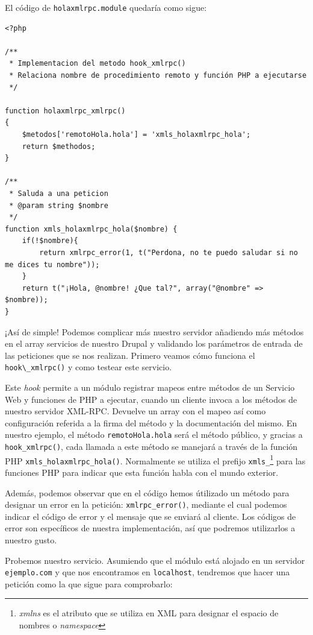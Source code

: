 El código de \verb|holaxmlrpc.module| quedaría como sigue:

\begin{verbatim}
<?php

/**
 * Implementacion del metodo hook_xmlrpc()
 * Relaciona nombre de procedimiento remoto y función PHP a ejecutarse
 */

function holaxmlrpc_xmlrpc()
{
    $metodos['remotoHola.hola'] = 'xmls_holaxmlrpc_hola';
    return $methodos;
}

/**
 * Saluda a una peticion
 * @param string $nombre
 */
function xmls_holaxmlrpc_hola($nombre) {
    if(!$nombre){
        return xmlrpc_error(1, t("Perdona, no te puedo saludar si no me dices tu nombre"));
    }
    return t("¡Hola, @nombre! ¿Que tal?", array("@nombre" => $nombre));
}
\end{verbatim}

¡Así de simple! Podemos complicar más nuestro servidor añadiendo más métodos en el array servicios de nuestro 
Drupal y validando los parámetros de entrada de las peticiones que se nos realizan. Primero veamos cómo funciona 
el \verb|hook\_xmlrpc()| y como testear este servicio.

Este \textit{hook} permite a un módulo registrar mapeos entre métodos de un Servicio Web y funciones de PHP 
a ejecutar, cuando un cliente invoca a los métodos de nuestro servidor XML-RPC. Devuelve un array con el mapeo así 
como configuración referida a la firma del método y la documentación del mismo. En nuestro ejemplo, el método 
\verb|remotoHola.hola| será el método público, y gracias a \verb|hook_xmlrpc()|, cada llamada a este método se 
manejará a través de la función PHP \verb|xmls_holaxmlrpc_hola()|. Normalmente se utiliza el prefijo \verb|xmls_|\footnote{
\textit{xmlns} es el atributo que se utiliza en XML para designar el espacio de nombres o \textit{namespace}} para las funciones 
PHP para indicar que esta función habla con el mundo exterior.

Además, podemos observar que en el código hemos útilizado un método para designar un error en la petición: 
\verb|xmlrpc_error()|, mediante el cual podemos indicar el código de error y el mensaje que se enviará al cliente. Los 
códigos de error son específicos de nuestra implementación, así que podremos utilizarlos a nuestro gusto.

Probemos nuestro servicio. Asumiendo que el módulo está alojado en un servidor \verb|ejemplo.com| y que nos 
encontramos en \verb|localhost|, tendremos que hacer una petición como la que sigue para comprobarlo:

